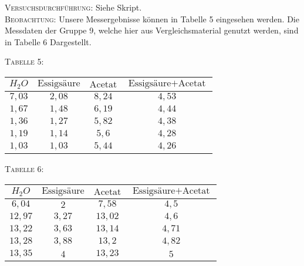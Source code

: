 \documentclass[11pt, a4paper]{article}
\begin{document}
\textsc{Versuchsdurchführung:} Siehe Skript.\\

\textsc{Beobachtung:}\hspace{5mm} Unsere Messergebnisse können in Tabelle 5 eingesehen werden. Die Messdaten der Gruppe 9, welche hier aus Vergleichsmaterial genutzt werden, sind in Tabelle 6 Dargestellt.\\

\begin{center}
\textsc{Tabelle 5:}\\
\begin{tabular}{cccc}
$H_2O$	&	$\text{Essigsäure}$	&	$\text{Acetat}$	&	$\text{Essigsäure} + \text{Acetat}$\\
\hline
$7,03$	&	$2,08$		&	$8,24$		&	$4,53$\\
$1,67$	&	$1,48$		&	$6,19$		&	$4,44$\\
$1,36$	&	$1,27$		&	$5,82$		&	$4,38$\\
$1,19$	&	$1,14$		&	$5,6$		&	$4,28$\\
$1,03$	&	$1,03$		&	$5,44$		&	$4,26$\\
\end{tabular}
\end{center}

\begin{center}
\textsc{Tabelle 6:}\\
\begin{tabular}{cccc}
$H_2O$	&	$\text{Essigsäure}$	&	$\text{Acetat}$	&	$\text{Essigsäure} + \text{Acetat}$\\
\hline
$6,04$	&	$2$		&	$7,58$	&	$4,5$\\
$12,97$	&	$3,27$	&	$13,02$	&	$4,6$\\
$13,22$	&	$3,63$	&	$13,14$	&	$4,71$\\
$13,28$	&	$3,88$	&	$13,2$	&	$4,82$\\
$13,35$	&	$4$		&	$13,23$	&	$5$\\

\end{tabular}
\end{center}
\end{document}
